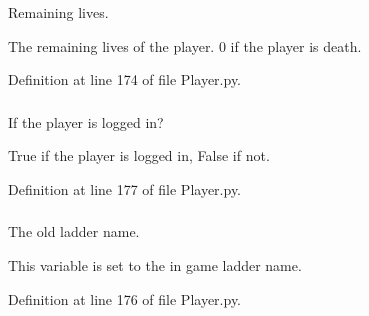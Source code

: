 Remaining lives. 

The remaining lives of the player. 0 if the player is death. 

Definition at line 174 of file Player.py.

\hypertarget{class_player_1_1_player_a040c3c6e90a7655064aa65adbb4387b6}{
\subsubsection[{\_\-\_\-logged\_\-in}]{}}
\label{class_player_1_1_player_a040c3c6e90a7655064aa65adbb4387b6}


If the player is logged in? 

True if the player is logged in, False if not. 

Definition at line 177 of file Player.py.

\hypertarget{class_player_1_1_player_a11f44d16220129d7efca52828dc13d4f}{
\subsubsection[{\_\-\_\-old\_\-ladder\_\-name}]{}}
\label{class_player_1_1_player_a11f44d16220129d7efca52828dc13d4f}


The old ladder name. 

This variable is set to the in game ladder name. 

Definition at line 176 of file Player.py.

\hypertarget{class_player_1_1_player_a43d105f816af7ba2c6dbe816ffaf4eba}{
\subsubsection[{\_\-\_\-old\_\-name}]{}}
\label{class_player_1_1_player_a43d105f816af7ba2c6dbe816ffaf4eba}


